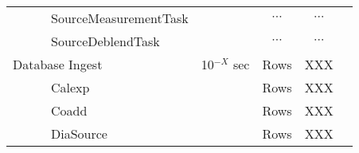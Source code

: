 \documentclass[12pt]{article}
\begin{document}
\begin{table*}[h]
\begin{center}
\begin{tabular}{lcccc}
~~~~~~SourceMeasurementTask   &               & $\cdots$     & $\cdots$        &           \\
~~~~~~SourceDeblendTask       &               & $\cdots$     & $\cdots$        &           \\
\hline
Database Ingest               & 10$^{-X}$ sec & Rows         & XXX             &           \\
~~~~~~Calexp                  &               & Rows         & XXX             &           \\
~~~~~~Coadd                   &               & Rows         & XXX             &           \\
~~~~~~DiaSource               &               & Rows         & XXX             &           \\
\hline
\hline
\end{tabular}
\end{center}
\end{table*}

\end{document}
